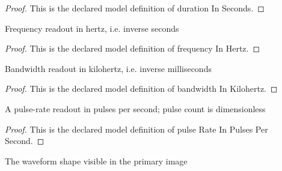 \begin{proof}
  This is the declared model definition of duration In Seconds.
\end{proof}
\begin{definition}
  \label{def:physics:phyx-mini-0649:phyxminiproblems-problemphyxmini0649-frequencyinhertz}
  Frequency readout in hertz, i.e. inverse seconds
\end{definition}
\begin{proof}
  This is the declared model definition of frequency In Hertz.
\end{proof}
\begin{definition}
  \label{def:physics:phyx-mini-0649:phyxminiproblems-problemphyxmini0649-bandwidthinkilohertz}
  Bandwidth readout in kilohertz, i.e. inverse milliseconds
\end{definition}
\begin{proof}
  This is the declared model definition of bandwidth In Kilohertz.
\end{proof}
\begin{definition}
  \label{def:physics:phyx-mini-0649:phyxminiproblems-problemphyxmini0649-pulserateinpulsespersecond}
  A pulse-rate readout in pulses per second; pulse count is dimensionless
\end{definition}
\begin{proof}
  This is the declared model definition of pulse Rate In Pulses Per Second.
\end{proof}
\begin{definition}
  \label{def:physics:phyx-mini-0649:phyxminiproblems-problemphyxmini0649-pulsetrainshape}
  The waveform shape visible in the primary image
\end{definition}
